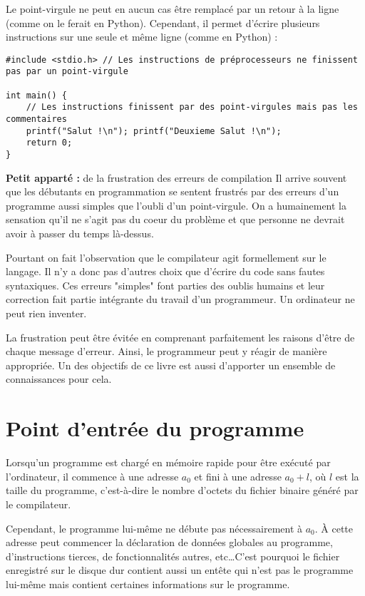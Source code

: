 \documentclass[../../../main.tex]{subfiles}
\begin{document}
Le point-virgule ne peut en aucun cas être remplacé par un retour à la ligne (comme on le ferait en Python). Cependant, il permet d'écrire plusieurs instructions sur une seule et même ligne (comme en Python) :
\begin{verbatim}
#include <stdio.h> // Les instructions de préprocesseurs ne finissent pas par un point-virgule

int main() {
	// Les instructions finissent par des point-virgules mais pas les commentaires
	printf("Salut !\n"); printf("Deuxieme Salut !\n"); 
	return 0;
}
\end{verbatim}

\begin{minitelbasicbox}{\textbf{Petit apparté :} de la frustration des erreurs de compilation}
Il arrive souvent que les débutants en programmation se sentent frustrés par des erreurs d'un programme aussi simples que l'oubli d'un point-virgule. On a humainement la sensation qu'il ne s'agit pas du coeur du problème et que personne ne devrait avoir à passer du temps là-dessus.

Pourtant on fait l'observation que le compilateur agit formellement sur le langage. Il n'y a donc pas d'autres choix que d'écrire du code sans fautes syntaxiques. Ces erreurs "simples" font parties des oublis humains et leur correction fait partie intégrante du travail d'un programmeur. Un ordinateur ne peut rien inventer.

La frustration peut être évitée en comprenant parfaitement les raisons d'être de chaque message d'erreur. Ainsi, le programmeur peut y réagir de manière appropriée. Un des objectifs de ce livre est aussi d'apporter un ensemble de connaissances pour cela.
\end{minitelbasicbox}
\section{Point d'entrée du programme}
Lorsqu'un programme est chargé en mémoire rapide pour être exécuté par l'ordinateur, il commence à une adresse $a_{0}$ et fini à une adresse $a_{0} + l$, où $l$ est la taille du programme, c'est-à-dire le nombre d'octets du fichier binaire généré par le compilateur.
 
Cependant, le programme lui-même ne débute pas nécessairement à $a_{0}$. À cette adresse peut commencer la déclaration de données globales au programme, d'instructions tierces, de fonctionnalités autres, etc\dots C'est pourquoi le fichier enregistré sur le disque dur contient aussi un entête qui n'est pas le programme lui-même mais contient certaines informations sur le programme.
\end{document}

